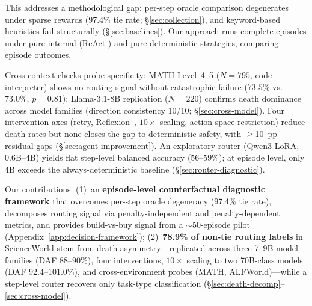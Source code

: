 This addresses a methodological gap: per-step oracle comparison degenerates under sparse rewards (97.4\% tie rate; \S\ref{sec:collection}), and keyword-based heuristics fail structurally (\S\ref{sec:baselines}). Our approach runs complete episodes under pure-internal (ReAct \citep{react-2023}) and pure-deterministic strategies, comparing episode outcomes.

Cross-context checks probe specificity: MATH Level~4--5 ($N{=}795$, code interpreter) shows no routing signal without catastrophic failure ($73.5\%$ vs.\ $73.0\%$, $p = 0.81$); Llama-3.1-8B replication ($N{=}220$) confirms death dominance across model families (direction consistency 10/10; \S\ref{sec:cross-model}). Four intervention axes (retry, Reflexion~\citep{reflexion-2023}, $10{\times}$ scaling, action-space restriction) reduce death rates but none closes the gap to deterministic safety, with ${\geq}$10~pp residual gaps (\S\ref{sec:agent-improvement}).
An exploratory router (Qwen3 LoRA, 0.6B--4B) yields flat step-level balanced accuracy ($56$--$59\%$); at episode level, only 4B exceeds the always-deterministic baseline (\S\ref{sec:router-diagnostic}).

Our contributions: (1)~an \textbf{episode-level counterfactual diagnostic framework} that overcomes per-step oracle degeneracy (97.4\% tie rate), decomposes routing signal via penalty-independent and penalty-dependent metrics, and provides build-vs-buy signal from a ${\sim}$50-episode pilot (Appendix~\ref{app:decision-framework}); (2)~\textbf{78.9\% of non-tie routing labels} in ScienceWorld stem from death asymmetry---replicated across three 7--9B model families (DAF $88$--$90\%$), four interventions, $10{\times}$ scaling to two 70B-class models (DAF $92.4$--$101.0\%$), and cross-environment probes (MATH, ALFWorld)---while a step-level router recovers only task-type classification (\S\ref{sec:death-decomp}--\ref{sec:cross-model}).
